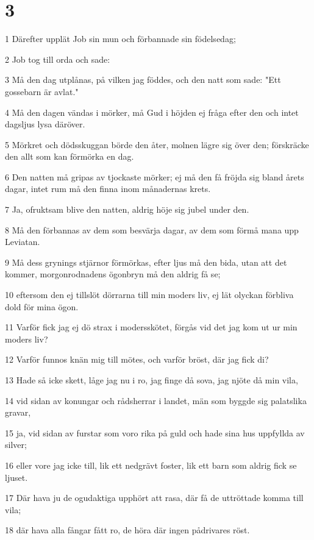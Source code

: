 \chapter{3}

\par 1 Därefter upplät Job sin mun och förbannade sin födelsedag;
\par 2 Job tog till orda och sade:
\par 3 Må den dag utplånas, på vilken jag föddes, och den natt som sade: "Ett gossebarn är avlat."
\par 4 Må den dagen vändas i mörker, må Gud i höjden ej fråga efter den och intet dagsljus lysa däröver.
\par 5 Mörkret och dödsskuggan börde den åter, molnen lägre sig över den; förskräcke den allt som kan förmörka en dag.
\par 6 Den natten må gripas av tjockaste mörker; ej må den få fröjda sig bland årets dagar, intet rum må den finna inom månadernas krets.
\par 7 Ja, ofruktsam blive den natten, aldrig höje sig jubel under den.
\par 8 Må den förbannas av dem som besvärja dagar, av dem som förmå mana upp Leviatan.
\par 9 Må dess grynings stjärnor förmörkas, efter ljus må den bida, utan att det kommer, morgonrodnadens ögonbryn må den aldrig få se;
\par 10 eftersom den ej tillslöt dörrarna till min moders liv, ej lät olyckan förbliva dold för mina ögon.
\par 11 Varför fick jag ej dö strax i modersskötet, förgås vid det jag kom ut ur min moders liv?
\par 12 Varför funnos knän mig till mötes, och varför bröst, där jag fick di?
\par 13 Hade så icke skett, låge jag nu i ro, jag finge då sova, jag njöte då min vila,
\par 14 vid sidan av konungar och rådsherrar i landet, män som byggde sig palatslika gravar,
\par 15 ja, vid sidan av furstar som voro rika på guld och hade sina hus uppfyllda av silver;
\par 16 eller vore jag icke till, lik ett nedgrävt foster, lik ett barn som aldrig fick se ljuset.
\par 17 Där hava ju de ogudaktiga upphört att rasa, där få de uttröttade komma till vila;
\par 18 där hava alla fångar fått ro, de höra där ingen pådrivares röst.
